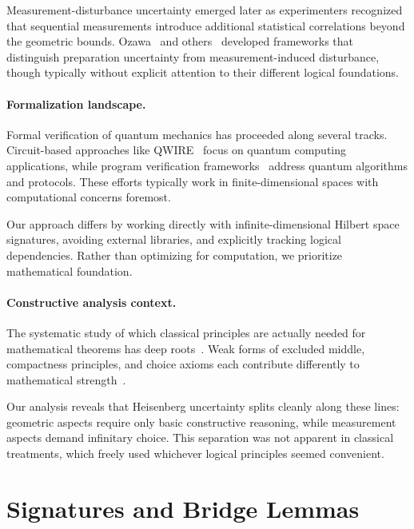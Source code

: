 \documentclass[11pt]{article}
\theoremstyle{plain}
\theoremstyle{definition}
\theoremstyle{remark}
\begin{document}
Measurement-disturbance uncertainty emerged later as experimenters recognized that sequential measurements introduce additional statistical correlations beyond the geometric bounds. Ozawa~\cite{Ozawa2003} and others~\cite{BuschLahtiWerner2014} developed frameworks that distinguish preparation uncertainty from measurement-induced disturbance, though typically without explicit attention to their different logical foundations.

\paragraph{Formalization landscape.}
Formal verification of quantum mechanics has proceeded along several tracks. Circuit-based approaches like QWIRE~\cite{QWIRE2017} focus on quantum computing applications, while program verification frameworks~\cite{Ying2016} address quantum algorithms and protocols. These efforts typically work in finite-dimensional spaces with computational concerns foremost.

Our approach differs by working directly with infinite-dimensional Hilbert space signatures, avoiding external libraries, and explicitly tracking logical dependencies. Rather than optimizing for computation, we prioritize mathematical foundation.

\paragraph{Constructive analysis context.}
The systematic study of which classical principles are actually needed for mathematical theorems has deep roots~\cite{BishopBridges,BridgesRichman,TroelstraVanDalen}. Weak forms of excluded middle, compactness principles, and choice axioms each contribute differently to mathematical strength~\cite{HowardRubin}.

Our analysis reveals that Heisenberg uncertainty splits cleanly along these lines: geometric aspects require only basic constructive reasoning, while measurement aspects demand infinitary choice. This separation was not apparent in classical treatments, which freely used whichever logical principles seemed convenient.

\section{Signatures and Bridge Lemmas}
\label{sec:signatures-bridges}
\end{document}
